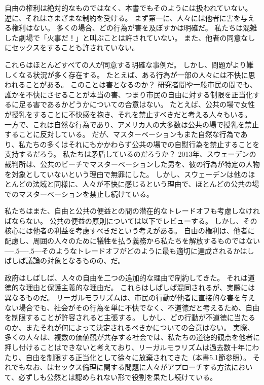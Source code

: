 \documentclass[paper=a4,book,openany]{jlreq}
\def\DDASH{―\kern-.5\zw―\kern-.5\zw―}
\begin{document}
自由の権利は絶対的なものではなく、本書でもそのようには扱われていない。
逆に、それはさまざまな制約を受ける。
まず第一に、人々には他者に害を与える権利はない。
多くの場合、どの行為が害を及ぼすかは明確だ。
私たちは混雑した劇場で「火事だ！」と叫ぶことは許されていない。
また、他者の同意なしにセックスをすることも許されていない。

これらはほとんどすべての人が同意する明確な事例だ。
しかし、問題がより難しくなる状況が多く存在する。
たとえば、ある行為が一部の人々には不快に思われることがある。
このことは害となるのか？ 研究者間や一般市民の間でも、誰かを不快にさせることが本当の害、つまり市民の自由に対する制限を正当化するに足る害であるかどうかについての合意はない。
たとえば、公共の場で女性が授乳をすることに不快感を抱き、それを禁止すべきだと考える人々もいる。
一方で、これは自然な行為であり、アメリカ人の大多数は公共の場で授乳を禁止することに反対している\citep{cdc08:_public_opinion_breas}。
だが、マスターベーションもまた自然な行為であり、私たちの多くはそれにもかかわらず公共の場での自慰行為を禁止することを支持するだろう。
私たちは矛盾しているのだろうか？ 2013年、スウェーデンの裁判所は、公共のビーチでマスターベーションした男を、彼の行為が特定の人物を対象としていないという理由で無罪にした\citep{ederyd13:_you_cant_just_walk_aroun}。
しかし、スウェーデンは他のほとんどの法域と同様に、人々が不快に感じるという理由で、ほとんどの公共の場でのマスターベーションを禁止し続けている。

私たちはまた、自由と公共の便益との間の潜在的なトレードオフも考慮しなければならない。
公共の便益の原則については以下でレビューする。
しかし、その核心には他者の利益を考慮すべきだという考えがある。
自由の権利は、他者に配慮し、周囲の人々のために犠牲を払う義務から私たちを解放するものではない{\DDASH}そのようなトレードオフがどのように最も適切に達成されるかはしばしば議論の対象となるものの、だ。

政府はしばしば、人々の自由を二つの追加的な理由で制約してきた。
それは道徳的な理由と保護主義的な理由だ。
これらはしばしば混同されるが、実際には異なるものだ。
リーガルモラリズムは、市民の行動が他者に直接的な害を与えない場合でも、社会がその行為を単に不快でなく、不道徳だと考えるため、自由を制限することが許容されると主張する。
しかし、どの行動が不道徳に当たるのか、またそれが何によって決定されるべきかについての合意はない。
実際、多くの人々は、複数の価値観が共存する社会では、私たちの道徳的観点を他者に押し付けることはできないと考えており、リーガルモラリズムは過去数十年にわたり、自由を制限する正当化として徐々に放棄されてきた（本書5.1節参照）。
それでもなお、はセックス倫理に関する問題に人々がアプローチする方法において、必ずしも公然とは認められない形で役割を果たし続けている。
\end{document}
